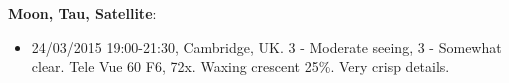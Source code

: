 {\bf Moon, Tau, Satellite}:
\begin{itemize}
\item 24/03/2015 19:00-21:30, Cambridge, UK. 3 - Moderate seeing, 3 - Somewhat clear. Tele Vue 60 F6, 72x. Waxing crescent 25\%. Very crisp details. 
\end{itemize}
